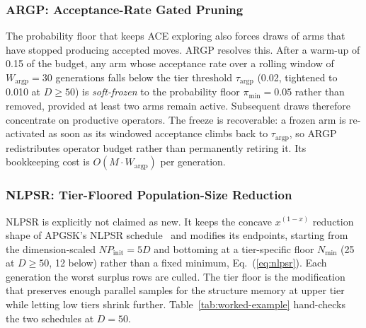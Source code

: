 \subsubsection{ARGP: Acceptance-Rate Gated Pruning}\label{sec:alg:argp}

The probability floor that keeps ACE exploring also forces draws of
arms that have stopped producing accepted moves.
ARGP resolves this. After a warm-up of 0.15 of
the budget, any arm whose acceptance rate over a rolling window of
$W_{\text{argp}}=30$ generations falls below the tier threshold
$\tau_{\text{argp}}$ (0.02, tightened to 0.010 at $D\ge50$) is
\emph{soft-frozen} to the probability floor $\pi_{\min}=0.05$ rather than removed,
provided at least two arms remain active. Subsequent draws therefore
concentrate on productive operators.  The freeze is recoverable: a frozen arm is re-activated
as soon as its windowed acceptance climbs back to $\tau_{\text{argp}}$, so ARGP
redistributes operator budget rather than permanently retiring it. %
Its bookkeeping cost is $O(M\cdot W_{\text{argp}})$ per
generation. %

\subsubsection{NLPSR: Tier-Floored Population-Size Reduction}\label{sec:alg:nlpsr}

NLPSR is explicitly not claimed as new. It keeps the concave $x^{(1-x)}$
reduction shape of APGSK's NLPSR schedule~\cite{apgsk2021} and
modifies its endpoints, starting from the dimension-scaled
$NP_{\text{init}}=5D$ and bottoming at a tier-specific floor
$N_{\min}$ (25 at $D\ge50$, 12 below) rather than a fixed minimum,
Eq.~(\ref{eq:nlpsr}). Each generation the worst surplus rows are
culled. %
The tier floor is the modification that preserves enough parallel
samples for the structure memory at upper tier while letting low
tiers shrink further.
Table~\ref{tab:worked-example} hand-checks the two schedules at
$D=50$.


